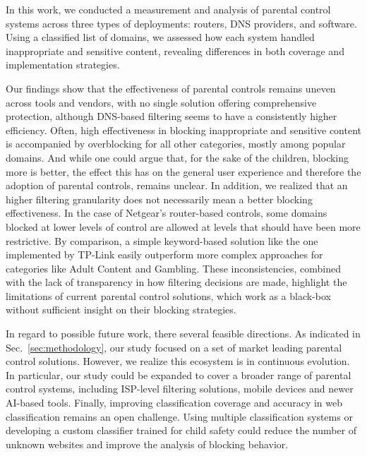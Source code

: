 In this work, we conducted a measurement and analysis of parental control systems across three types of deployments: routers, DNS providers, and software. Using a classified list of domains, we assessed how each system handled inappropriate and sensitive content, revealing differences in both coverage and implementation strategies.


Our findings show that the effectiveness of parental controls remains uneven across tools and vendors, with no single solution offering comprehensive protection, although DNS-based filtering seems to have a consistently higher efficiency. Often, high effectiveness in blocking inappropriate and sensitive content is accompanied by overblocking for all other categories, mostly among popular domains. And while one could argue that, for the sake of the children, blocking more is better, the effect this has on the general user experience and therefore the adoption of parental controls, remains unclear. In addition, we realized that an higher filtering granularity does not necessarily mean a better blocking effectiveness.
In the case of Netgear’s router-based controls, some domains blocked at lower levels of control are allowed at levels that should have been more restrictive. By comparison, a simple keyword-based solution like the one implemented by TP-Link easily outperform more complex approaches for categories like Adult Content and Gambling. These inconsistencies, combined with the lack of transparency in how filtering decisions are made, highlight the limitations of current parental control solutions, which work as a black-box without sufficient insight on their blocking strategies.



In regard to possible future work, there several feasible directions. As indicated in Sec.~\ref{sec:methodology}, our study focused on a set of market leading parental control solutions. However, we realize this ecosystem is in continuous evolution. In particular, our study could be expanded to cover a broader range of parental control systems, including ISP-level filtering solutions, mobile devices and newer AI-based tools.
Finally, improving classification coverage and accuracy in web classification remains an open challenge. 
Using multiple classification systems or developing a custom classifier trained for child safety could reduce the number of unknown websites and improve the analysis of blocking behavior.